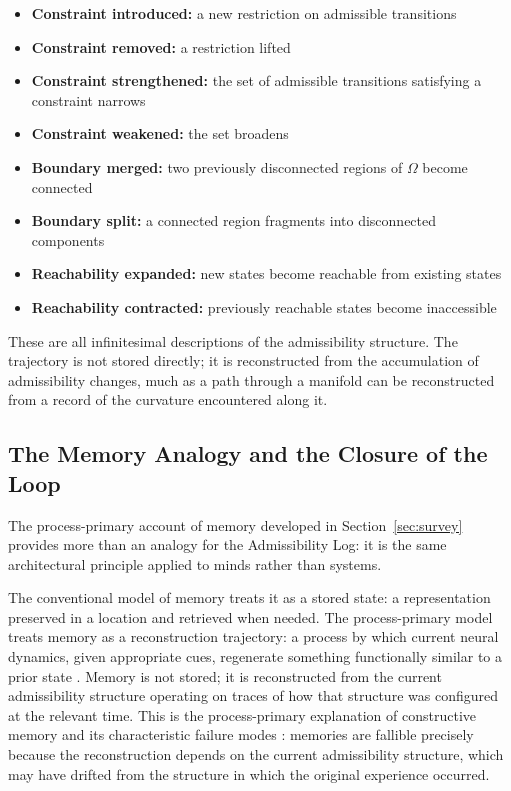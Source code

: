 \documentclass[12pt, a4paper]{article}
\theoremstyle{plain}
\theoremstyle{definition}
\theoremstyle{remark}
\begin{document}
\begin{itemize}[leftmargin=*]
\item \textbf{Constraint introduced:} a new restriction on admissible transitions
\item \textbf{Constraint removed:} a restriction lifted
\item \textbf{Constraint strengthened:} the set of admissible transitions satisfying a constraint narrows
\item \textbf{Constraint weakened:} the set broadens
\item \textbf{Boundary merged:} two previously disconnected regions of $\Omega$ become connected
\item \textbf{Boundary split:} a connected region fragments into disconnected components
\item \textbf{Reachability expanded:} new states become reachable from existing states
\item \textbf{Reachability contracted:} previously reachable states become inaccessible
\end{itemize}

These are all infinitesimal descriptions of the admissibility structure.
The trajectory is not stored directly; it is reconstructed from the
accumulation of admissibility changes, much as a path through a manifold
can be reconstructed from a record of the curvature encountered along it.

\subsection{The Memory Analogy and the Closure of the Loop}
\label{subsec:memloop}

The process-primary account of memory developed in Section~\ref{sec:survey}
provides more than an analogy for the Admissibility Log: it is the same
architectural principle applied to minds rather than systems.

The conventional model of memory treats it as a stored state: a representation
preserved in a location and retrieved when needed. The process-primary model
treats memory as a reconstruction trajectory: a process by which current neural
dynamics, given appropriate cues, regenerate something functionally similar to
a prior state \citep{friston2010,varela1991}. Memory is not stored; it is
reconstructed from the current admissibility structure operating on traces of
how that structure was configured at the relevant time. This is the
process-primary explanation of constructive memory and its characteristic
failure modes \citep{schacter1996}: memories are fallible precisely because
the reconstruction depends on the current admissibility structure, which may
have drifted from the structure in which the original experience occurred.
\end{document}
